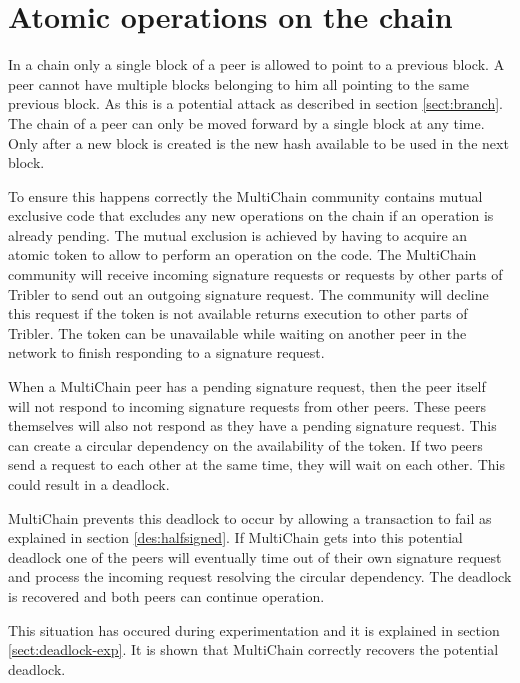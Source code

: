 \section{Atomic operations on the chain}
\label{sect:deadlock}
In a chain only a single block of a peer is allowed to point to a previous block.
A peer cannot have multiple blocks belonging to him all pointing to the same previous block.
As this is a potential attack as described in section \ref{sect:branch}.
The chain of a peer can only be moved forward by a single block at any time.
Only after a new block is created is the new hash available to be used in the next block.

To ensure this happens correctly the MultiChain community contains mutual exclusive code
that excludes any new operations on the chain if an operation is already pending.
The mutual exclusion is achieved by having to acquire an atomic token to allow to perform an operation on the code.
The MultiChain community will receive incoming signature requests
or requests by other parts of Tribler to send out an outgoing signature request.
The community will decline this request if the token is not available
returns execution to other parts of Tribler.
The token can be unavailable while waiting on another peer in the network to finish responding to a signature request.

When a MultiChain peer has a pending signature request,
then the peer itself will not respond to incoming signature requests from other peers.
These peers themselves will also not respond as they have a pending signature request.
This can create a circular dependency on the availability of the token.
If two peers send a request to each other at the same time, they will wait on each other.
This could result in a deadlock.

MultiChain prevents this deadlock to occur by allowing a transaction to fail
as explained in section \ref{des:halfsigned}.
If MultiChain gets into this potential deadlock one of the peers will eventually time out of their own signature request
and process the incoming request resolving the circular dependency.
The deadlock is recovered and both peers can continue operation.

This situation has occured during experimentation and it is explained in section \ref{sect:deadlock-exp}.
It is shown that MultiChain correctly recovers the potential deadlock.

